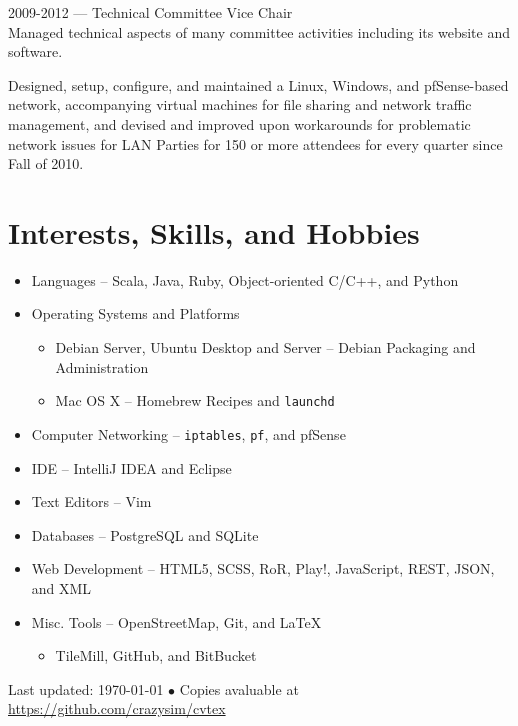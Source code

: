 \documentclass[10pt, letter]{article}
\newcommand{\years}[1]{\marginnote{#1}}
\renewcommand{\years}[1]{#1 --- }
\begin{document}
\begin{multicols}{2}
\years{2009-2012} Technical Committee Vice Chair \\
Managed technical aspects of many committee activities including its website
and software.

Designed, setup, configure, and maintained a Linux, Windows, and pfSense-based
network, accompanying virtual machines for file sharing and network traffic
management, and devised and improved upon workarounds for problematic network
issues for LAN Parties for 150 or more attendees for every quarter since Fall
of 2010.

\section*{Interests, Skills, and Hobbies}

\begin{itemize}
    \item Languages -- Scala, Java, Ruby, Object-oriented C/C++, and Python
    \item Operating Systems and Platforms
        \begin{itemize}
            \item Debian Server, Ubuntu Desktop and Server -- Debian Packaging and Administration
            \item Mac OS X -- Homebrew Recipes and \texttt{launchd}
        \end{itemize}
    \item Computer Networking -- \texttt{iptables}, \texttt{pf}, and pfSense
    \item IDE -- IntelliJ IDEA and Eclipse
    \item Text Editors -- Vim
    \item Databases -- PostgreSQL and SQLite
    \item Web Development -- HTML5, SCSS, RoR, Play!, JavaScript, REST, JSON, and XML
    \item Misc. Tools -- OpenStreetMap, Git, and \LaTeX
        \begin{itemize}
            \item TileMill, GitHub, and BitBucket
        \end{itemize}
\end {itemize}

\end{multicols}




\vfill{}

\begin{center}
{\scriptsize  Last updated: \today\- $\bullet$\- 
Copies avaluable at \href{https://github.com/crazysim/cvtex}{https://github.com/crazysim/cvtex}}
\end{center}
\end{document}
